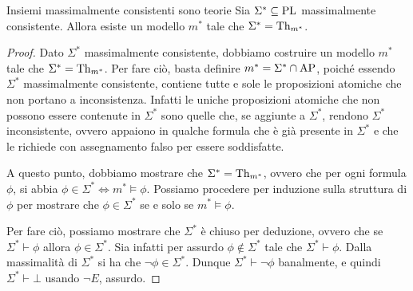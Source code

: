 \begin{proposition}[label=prop:max-consistent-set-are-theory]{Insiemi massimalmente consistenti sono teorie}
  Sia \(\Sigma^* \subseteq \operatorname{PL}\) massimalmente consistente. Allora esiste un modello \(m^*\) tale che \(\Sigma^* = \operatorname{Th}_{m^*}\).
\end{proposition}

\begin{proof}
  Dato \(\Sigma^*\) massimalmente consistente, dobbiamo costruire un modello \(m^*\) tale che \(\Sigma^* = \operatorname{Th}_{m^*}\).
  Per fare ciò, basta definire \(m^* = \Sigma^*\cap\AP\), poiché essendo \(\Sigma^*\) massimalmente consistente, contiene tutte e sole le proposizioni atomiche che non portano a inconsistenza.
  Infatti le uniche proposizioni atomiche che non possono essere contenute in \(\Sigma^*\) sono quelle che, se aggiunte a \(\Sigma^*\), rendono \(\Sigma^*\) inconsistente, ovvero appaiono in qualche formula che è già presente in \(\Sigma^*\) e che le richiede con assegnamento falso per essere soddisfatte.

  A questo punto, dobbiamo mostrare che \(\Sigma^* = \operatorname{Th}_{m^*}\), ovvero che per ogni formula \(\phi\), si abbia \(\phi \in \Sigma^* \iff m^* \models \phi\).
  Possiamo procedere per induzione sulla struttura di \(\phi\) per mostrare che \(\phi \in \Sigma^*\) se e solo se \(m^*\models\phi\).

  Per fare ciò, possiamo mostrare che \(\Sigma^*\) è chiuso per deduzione, ovvero che se \(\Sigma^*\vdash\phi\) allora \(\phi\in\Sigma^*\).
  Sia infatti per assurdo \(\phi\not\in\Sigma^*\) tale che \(\Sigma^*\vdash\phi\). Dalla massimalità di \(\Sigma^*\) si ha che \(\neg\phi\in\Sigma^*\). Dunque \(\Sigma^*\vdash\neg\phi\) banalmente, e quindi \(\Sigma^*\vdash\bot\) usando \(\neg E\), assurdo.
  

\end{proof}
